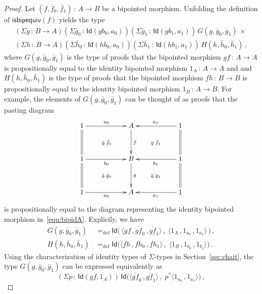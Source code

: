\documentclass[10pt,a4paper,oneside,reqno]{amsart}
\numberwithin{equation}{section}
\theoremstyle{mythm}
\theoremstyle{mydef}
\theoremstyle{myrmk}
\newcommand{\defeq}{=_{\mathrm{def}}}
\newcommand{\co}{\,{:}\,}
\newcommand{\Id}{\mathsf{Id}}
\newcommand{\isbipequiv}{\mathsf{isbipequiv}}
\begin{document}
\begin{proof} Let $(f, \bar{f}_0, \bar{f}_1) \co A \to B$ be a bipointed morphism. Unfolding  the definition
of  $\isbipequiv(f)$ yields the type
\begin{multline}
\label{equ:unfoldisbipequiv} 
(\Sigma g \co B \to  A)
(\Sigma \bar{g}_0 \co \Id( g b_0, a_0)) 
(\Sigma  \bar{g}_1 \co \Id( g b_1, a_1)) \, 
 G(g,\bar{g}_0,\bar{g}_1) \, \times \\
 (\Sigma h \co B \to A)
 (\Sigma \bar{h}_0 \co \Id ( h b_0,  a_0))
 (\Sigma \bar{h}_1 \co  \Id ( h b_1,  a_1)) \, 
 H(h,\bar{h}_0,\bar{h}_1)   \, ,
\end{multline}
where $G(g, \bar{g}_0, \bar{g}_1)$ is the type of proofs that the
bipointed morphism  $g  f \co A \to A$ is propositionally equal to the identity bipointed morphism
$1_A \co A \to A$ and and  $H(h, \bar{h}_0, \bar{h}_1)$ is the type of proofs that the
bipointed morphism  $f  h \co B \to B$ is propositionally equal to the identity bipointed morphism
$1_B \co A \to B$. For example, the elements of $G(g, \bar{g}_0, \bar{g}_1)$ can be thought of as
proofs that the pasting diagram 
\[
\xymatrix@C=2cm@R=1.2cm{
1    \ar[r]^{a_0} \ar@{=}[d]  \ar@{}[dr]|{\Downarrow \, \bar{f}_0} & A  \ar[d]^{f} & 1  \ar[l]_{a_1} \ar@{=}[d] \ar@{}[dl]|{\Downarrow \,  \bar{f}_1} \\
1 \ar[r]_{b_0}   \ar@{}[dr]|{\Downarrow \, \bar{g}_0}  \ar@{=}[d] & B \ar[d]^g   & 1 \ar[l]^{b_1} \ar@{=}[d] \ar@{}[dl]|{\Downarrow \,  \bar{g}_1} \\
1 \ar[r]_{a_0}  & A   & 1 \ar[l]^{a_1}}
\]
is propositionally equal to the diagram representing the identity bipointed morphism in~\eqref{equ:bipidA}. 
Explicily, we have
\begin{align*}
G(g,\bar{g}_0,\bar{g}_1) & \defeq 
\Id 
\big( \, 
\langle 
g f \, ,  \overline{gf}_0  \, ,    \overline{gf}_1 
\rangle \, , \;
\langle 
1_A \, ,  1_{a_0} \, , 1_{a_1} 
\rangle \, 
\big)  \, , \\
H(h,\bar{h}_0,\bar{h}_1) & \defeq 
\Id 
\big( 
\langle
 f  h \, ,   \overline{fh}_0 \, , \overline{fh}_1   
 \rangle \, , \; 
 \langle 
 1_B \, ,  1_{b_0} \, , 1_{b_1} 
 \rangle 
 \big) \, .
\end{align*}
Using the characterization of identity types of $\Sigma$-types in Section~\ref{sec:chait}, the type $G(g,\bar{g}_0,\bar{g}_1)$ can be  expressed equivalently as
\[
(\Sigma p \co  \Id( g f, 1_A)) \, 
\Id 
\big(  
\langle 
\overline{gf}_0  \, ,    \overline{gf}_1 
\rangle \, ,  \; 
 p^*
 \langle 
 1_{a_0} \, , 1_{a_1}  
 \rangle  
 \big) \, ,
\]
\end{proof}
\end{document}

